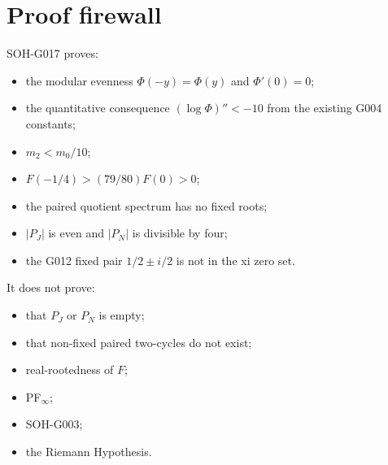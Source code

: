 \section{Proof firewall}

SOH-G017 proves:
\begin{itemize}
 \item the modular evenness $\Phi(-y)=\Phi(y)$ and $\Phi'(0)=0$;
 \item the quantitative consequence $(\log\Phi)''<-10$ from the existing
       G004 constants;
 \item $m_2<m_0/10$;
 \item $F(-1/4)>(79/80)F(0)>0$;
 \item the paired quotient spectrum has no fixed roots;
 \item $|P_J|$ is even and $|P_N|$ is divisible by four;
 \item the G012 fixed pair $1/2\pm i/2$ is not in the xi zero set.
\end{itemize}

It does not prove:
\begin{itemize}
 \item that $P_J$ or $P_N$ is empty;
 \item that non-fixed paired two-cycles do not exist;
 \item real-rootedness of $F$;
 \item PF$_\infty$;
 \item SOH-G003;
 \item the Riemann Hypothesis.
\end{itemize}
